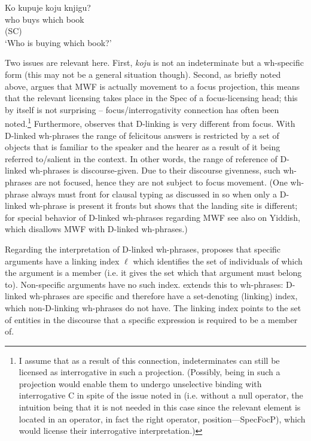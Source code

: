 \documentclass[output=paper,colorlinks,citecolor=brown]{langscibook}
\begin{document}
 
\ea\label{ex:bosk:21}
\gll Ko    kupuje     koju   knjigu?\\
who buys which book\\ \hfill (SC)\\
\glt `Who is buying which book?'
\z 

\noindent Two issues are relevant here. First, \textit{koju} is not an indeterminate but a wh-specific form (this may not be a general situation though). Second, as briefly noted above, \citet{Bošković2002} argues that MWF is actually movement to a focus projection, this means that the relevant licensing takes place in the Spec of a focus-licensing head; this by itself is not surprising -- focus/interrogativity connection has often been noted.\footnote{I assume that as a result of this connection, indeterminates can still be licensed as interrogative in such a projection. (Possibly, being in such a projection would enable them to undergo unselective binding with interrogative C in spite of the issue noted in  (i.e. without a null operator, the intuition being that it is not needed in this case since the relevant element is located in an operator, in fact the right operator, position—SpecFocP), which would license their interrogative interpretation.)} Furthermore, \citet{Bošković2002} observes that D-linking is very different from focus. With D-linked wh-phrases the range of felicitous answers is restricted by a set of objects that is familiar to the speaker and the hearer as a result of it being referred to/salient in the context. In other words, the range of reference of D-linked wh-phrases is discourse-given. Due to their discourse givenness, such wh-phrases are not focused, hence they are not subject to focus movement. (One wh-phrase always must front for clausal typing as discussed in \citealt{Cheng1991} so when only a D-linked wh-phrase is present it fronts but \citealt{Bošković2002} shows that the landing site is different; for special behavior of D-linked wh-phrases regarding MWF see also \citealt{Diesing2003} on Yiddish, which disallows MWF with D-linked wh-phrases.)

Regarding the interpretation of D-linked wh-phrases, \citet{Enç2003} proposes that specific arguments have a linking index $\ell $ which identifies the set of individuals of which the argument is a member (i.e. it gives the set which that argument must belong to). Non-specific arguments have no such index. \citet{Shields2008} extends this to wh-phrases: D-linked wh-phrases are specific and therefore have a set-denoting (linking) index, which non-D-linking wh-phrases do not have. The linking index points to the set of entities in the discourse that a specific expression is required to be a member of.
\end{document}
